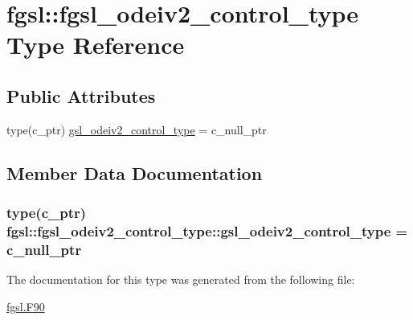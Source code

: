 \hypertarget{structfgsl_1_1fgsl__odeiv2__control__type}{\section{fgsl\-:\-:fgsl\-\_\-odeiv2\-\_\-control\-\_\-type Type Reference}
\label{structfgsl_1_1fgsl__odeiv2__control__type}
}
\subsection*{Public Attributes}
\begin{DoxyCompactItemize}
\item 
type(c\-\_\-ptr) \hyperlink{structfgsl_1_1fgsl__odeiv2__control__type_a4adaf9a7e91a79cc2104841b9e0710b5}{gsl\-\_\-odeiv2\-\_\-control\-\_\-type} = c\-\_\-null\-\_\-ptr
\end{DoxyCompactItemize}


\subsection{Member Data Documentation}
\hypertarget{structfgsl_1_1fgsl__odeiv2__control__type_a4adaf9a7e91a79cc2104841b9e0710b5}{
\subsubsection[{gsl\-\_\-odeiv2\-\_\-control\-\_\-type}]{\setlength{\rightskip}{0pt plus 5cm}type(c\-\_\-ptr) fgsl\-::fgsl\-\_\-odeiv2\-\_\-control\-\_\-type\-::gsl\-\_\-odeiv2\-\_\-control\-\_\-type = c\-\_\-null\-\_\-ptr}}\label{structfgsl_1_1fgsl__odeiv2__control__type_a4adaf9a7e91a79cc2104841b9e0710b5}


The documentation for this type was generated from the following file\-:\begin{DoxyCompactItemize}
\item 
\hyperlink{fgsl_8F90}{fgsl.\-F90}\end{DoxyCompactItemize}
